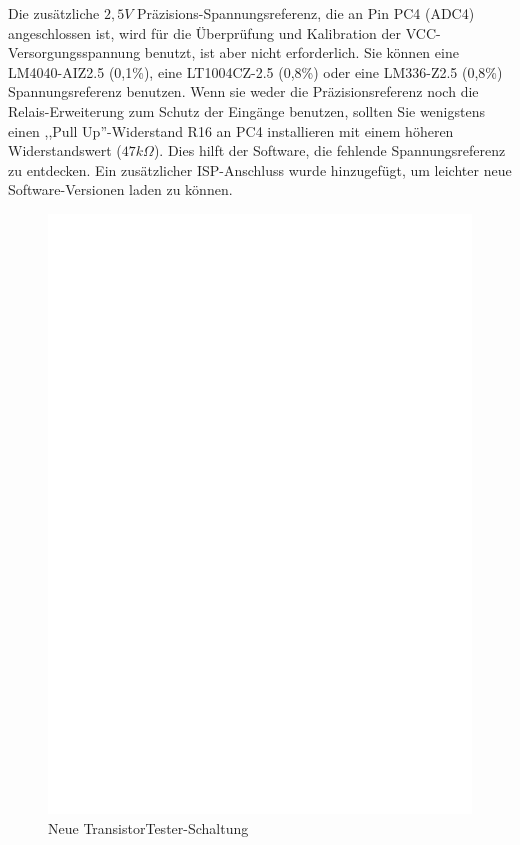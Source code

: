 Die zusätzliche \(2,5V\) Präzisions-Spannungsreferenz, die an Pin PC4 (ADC4) angeschlossen ist,
wird für die Überprüfung und Kalibration der VCC-Versorgungsspannung benutzt, ist aber nicht
erforderlich.
Sie können eine LM4040-AIZ2.5 (0,1\%),
eine LT1004CZ-2.5 (0,8\%) oder eine LM336-Z2.5 (0,8\%) Spannungsreferenz benutzen.
Wenn sie weder die Präzisionsreferenz noch die Relais-Erweiterung zum Schutz der Eingänge benutzen,
sollten Sie wenigstens einen ,,Pull Up''-Widerstand R16 an PC4 installieren mit einem
höheren Widerstandswert (\(47k\Omega\)).
Dies hilft der Software, die fehlende Spannungsreferenz zu entdecken.
Ein zusätzlicher ISP-Anschluss wurde hinzugefügt, um leichter neue Software-Versionen
laden zu können.

\begin{figure}[H]
\centering
\includegraphics[width=18cm]{../FIG/ttester.eps}
\caption{Neue TransistorTester-Schaltung}
\label{fig:ttester}
\end{figure}

